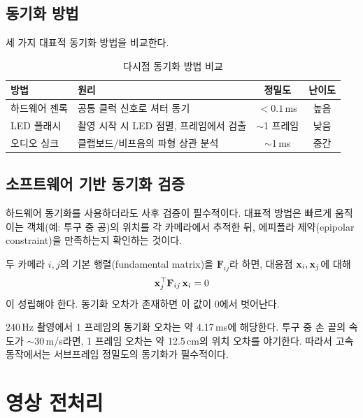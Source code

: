 \documentclass[11pt, a4paper]{report}
\begin{document}
\subsection{동기화 방법}

세 가지 대표적 동기화 방법을 비교한다.

\begin{table}[H]
\centering
\caption{다시점 동기화 방법 비교}
\begin{tabularx}{\textwidth}{lXcc}
\toprule
\textbf{방법} & \textbf{원리} & \textbf{정밀도} & \textbf{난이도} \\
\midrule
하드웨어 젠록 & 공통 클럭 신호로 셔터 동기 & $<0.1$\,ms & 높음 \\
LED 플래시 & 촬영 시작 시 LED 점멸, 프레임에서 검출 & $\sim$1 프레임 & 낮음 \\
오디오 싱크 & 클랩보드/비프음의 파형 상관 분석 & $\sim$1\,ms & 중간 \\
\bottomrule
\end{tabularx}
\end{table}

\subsection{소프트웨어 기반 동기화 검증}

하드웨어 동기화를 사용하더라도 사후 검증이 필수적이다.
대표적 방법은 빠르게 움직이는 객체(예: 투구 중 공)의 위치를 각 카메라에서 추적한 뒤,
에피폴라 제약(epipolar constraint)을 만족하는지 확인하는 것이다.

\begin{definition}[에피폴라 제약]
두 카메라 $i, j$의 기본 행렬(fundamental matrix)을 $\mathbf{F}_{ij}$라 하면,
대응점 $\mathbf{x}_i, \mathbf{x}_j$에 대해
\begin{equation}
  \mathbf{x}_j^\top \mathbf{F}_{ij}\, \mathbf{x}_i = 0
\end{equation}
이 성립해야 한다. 동기화 오차가 존재하면 이 값이 0에서 벗어난다.
\end{definition}

\begin{remark}
240\,Hz 촬영에서 1 프레임의 동기화 오차는 약 4.17\,ms에 해당한다.
투구 중 손 끝의 속도가 $\sim$30\,m/s라면, 1 프레임 오차는 약 12.5\,cm의 위치 오차를 야기한다.
따라서 고속 동작에서는 서브프레임 정밀도의 동기화가 필수적이다.
\end{remark}

\section{영상 전처리}
\end{document}
